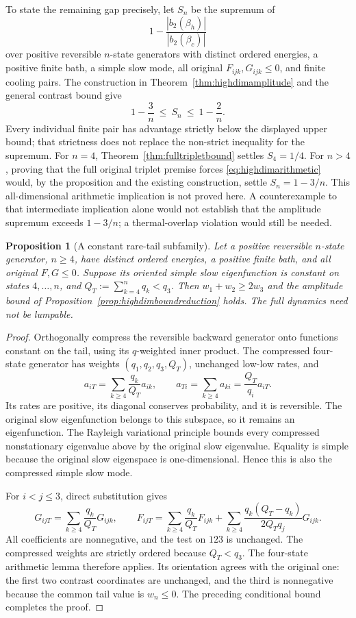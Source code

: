 \documentclass[11pt]{article}
\newtheorem{proposition}{Proposition}
\begin{document}
To state the remaining gap precisely, let $S_n$ be the supremum of
\[
1-\frac{|b_2(\beta_h)|}{|b_2(\beta_c)|}
\]
over positive reversible $n$-state generators with distinct ordered
energies, a positive finite bath, a simple slow mode, all original
$F_{ijk},G_{ijk}\leq0$, and finite cooling pairs. The construction in
Theorem~\ref{thm:highdimamplitude} and the general contrast bound give
\[
1-\frac3n\ \leq\ S_n\ \leq\ 1-\frac2n.
\]
Every individual finite pair has advantage strictly below the displayed
upper bound; that strictness does not replace the non-strict inequality
for the supremum. For $n=4$, Theorem~\ref{thm:fulltripletbound} settles
$S_4=1/4$. For $n>4$, proving that the full original triplet premise
forces \eqref{eq:highdimarithmetic} would, by the proposition and the
existing construction, settle $S_n=1-3/n$. This all-dimensional
arithmetic implication is not proved here. A counterexample to that
intermediate implication alone would not establish that the amplitude
supremum exceeds $1-3/n$; a thermal-overlap violation would still be needed.

\begin{proposition}[A constant rare-tail subfamily]
Let a positive reversible $n$-state generator, $n\geq4$, have distinct
ordered energies, a positive finite bath, and all original $F,G\leq0$.
Suppose its oriented simple slow eigenfunction is constant on states $4,\ldots,n$, and
$Q_T:=\sum_{k=4}^n q_k<q_3$. Then $w_1+w_2\geq2w_3$ and the
amplitude bound of Proposition~\ref{prop:highdimboundreduction} holds.
The full dynamics need not be lumpable.
\end{proposition}
\begin{proof}
Orthogonally compress the reversible backward generator onto functions
constant on the tail, using its $q$-weighted inner product. The compressed
four-state generator has weights $(q_1,q_2,q_3,Q_T)$, unchanged low-low
rates, and
\[
a_{iT}=\sum_{k\geq4}\frac{q_k}{Q_T}a_{ik},\qquad
a_{Ti}=\sum_{k\geq4}a_{ki}=\frac{Q_T}{q_i}a_{iT}.
\]
Its rates are positive, its diagonal conserves probability, and it is
reversible. The original slow eigenfunction belongs to this subspace,
so it remains an eigenfunction. The Rayleigh variational principle bounds
every compressed nonstationary eigenvalue above by the original slow
eigenvalue. Equality is simple because the original slow eigenspace is
one-dimensional. Hence this is also the compressed simple slow mode.

For $i<j\leq3$, direct substitution gives
\[
G_{ijT}=\sum_{k\geq4}\frac{q_k}{Q_T}G_{ijk},\qquad
F_{ijT}=\sum_{k\geq4}\frac{q_k}{Q_T}F_{ijk}
 +\sum_{k\geq4}\frac{q_k(Q_T-q_k)}{2Q_Tq_j}G_{ijk}.
\]
All coefficients are nonnegative, and the test on $123$ is unchanged.
The compressed weights are strictly ordered because $Q_T<q_3$.
The four-state arithmetic lemma therefore applies. Its orientation agrees
with the original one: the first two contrast coordinates are unchanged,
and the third is nonnegative because the common tail value is $w_n\leq0$.
The preceding conditional bound completes the proof.
\end{proof}
\end{document}
